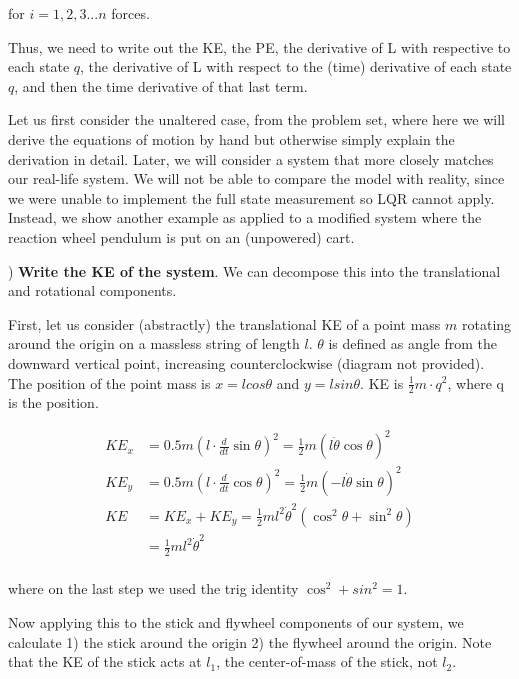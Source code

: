 \documentclass[conference]{IEEEtran}
\begin{document}
for $i = 1,2,3 ... n $ forces.

Thus, we need to write out the KE, the PE, the derivative of L with respective
to each state $q$, the derivative of L with respect to the (time) derivative of
each state $q$, and then the time derivative of that last term.

Let us first consider the unaltered case, from the problem set, where here we
will derive the equations of motion by hand but otherwise simply explain the
derivation in detail. Later, we will consider a system that more closely matches
our real-life system. We will not be able to compare the model with reality,
since we were unable to implement the full state measurement so LQR cannot
apply. Instead, we show another example as applied to a modified system where
the reaction wheel pendulum is put on an (unpowered) cart.


) \textbf{Write the KE of the system}. We can decompose this into the translational and
rotational components.

First, let us consider (abstractly) the translational KE of a point mass $m$ rotating
around the origin on a massless string of length $l$. $\theta$ is defined as
angle from the downward vertical point, increasing counterclockwise  (diagram not provided).
The position of the point mass is $x = l cos \theta$ and $y = l sin \theta$.
KE is $\frac{1}{2} m \cdot q^2$, where q is the position.

\begin{align}
    KE_x &= 0.5 m (l \cdot \frac{d}{dt} \sin \theta)^2 = \frac{1}{2} m (l \dot\theta \cos \theta)^2 \\
    KE_y &= 0.5 m (l \cdot \frac{d}{dt} \cos \theta)^2  = \frac{1}{2} m (- l \dot\theta \sin\theta)^2 \\
    KE &= KE_x + KE_y = \frac{1}{2} m l^2 \dot \theta^2 (\cos^2 \theta + \sin^2 \theta) \\
       &= \frac{1}{2} m l^2 \dot\theta^2 \\
\end{align}

where on the last step we used the trig identity $\cos^2 + sin^2 = 1$.

Now applying this to the stick and flywheel components of our system, we
calculate 1) the stick around the origin 2) the flywheel around the origin. Note
that the KE of the stick acts at $l_1$, the center-of-mass of the stick, not
$l_2$.
\end{document}
